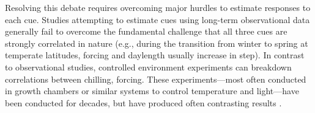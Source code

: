 \documentclass{article}
\begin{document}
\par Resolving this debate requires overcoming major hurdles to estimate responses to each cue. Studies attempting to estimate cues using long-term observational data \citep[e.g.,][]{vitasse2013, zohner2016} generally fail to overcome the fundamental challenge that all three cues are strongly correlated in nature (e.g., during the transition from winter to spring at temperate latitudes, forcing and daylength usually increase in step). In contrast to observational studies, controlled environment experiments can breakdown correlations between chilling, forcing. These experiments---most often conducted in growth chambers or similar systems to control temperature and light---have been conducted for decades, but have produced often contrasting results \citep{zohner2016,Laube:2014a,Basler:2012,Caffarra:2011b,Caffarra:2011a}. 


\end{document}
